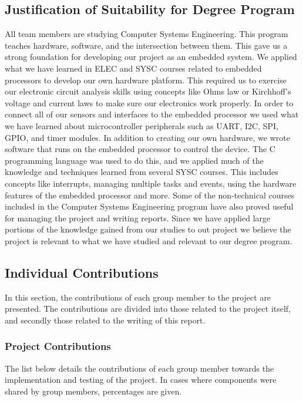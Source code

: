 \subsection{Justification of Suitability for Degree Program}

All team members are studying Computer Systems Engineering.  This program
teaches hardware, software, and the intersection between them.  This gave us a
strong foundation for developing our project as an embedded system.  We
applied what we have learned in ELEC and SYSC courses related to embedded
processors to develop our own hardware platform.  This required us to
exercise our electronic circuit analysis skills using concepts like Ohms law or
Kirchhoff’s voltage and current laws to make sure our electronics work
properly.  In order to connect all of our sensors and interfaces to the
embedded processor we used what we have learned about microcontroller
peripherals such as UART, I2C, SPI, GPIO, and timer modules.  In addition to 
creating our own hardware, we wrote software that runs on the embedded processor
to control the device.  The C programming language was used to do this, and we 
applied much of the knowledge and techniques learned from several SYSC courses.  
This includes concepts like interrupts, managing multiple tasks and events, 
using the hardware features of the embedded processor and more.  Some of the
non-technical courses included in the Computer Systems Engineering program have 
also proved useful for managing the project and writing reports. 
Since we 
have applied large portions of the knowledge gained from our studies to
out project we believe the project is relevant to what we have studied and 
relevant to our degree program.

\subsection{Individual Contributions}
In this section, the contributions of each group member to the project are
presented. The contributions are divided into those related to the project 
itself, and secondly those related to the writing of this report.

\subsubsection{Project Contributions}
The list below details the contributions of each group member towards the
implementation and testing of the project. In cases where components were 
shared by group members, percentages are given.

